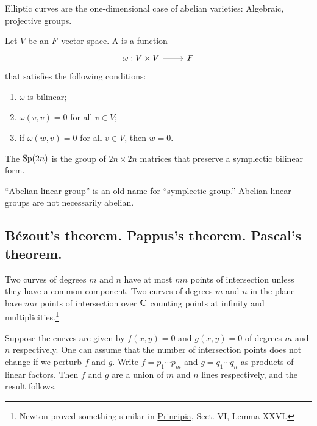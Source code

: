\documentclass [11 pt, oneside] {article}
\begin{document}
Elliptic curves are the one-dimensional case of abelian varieties: Algebraic, projective groups.

\begin{definition}
Let $V$ be an $F$--vector space. A  is a function 
\[
\begin{tikzcd}
\omega :V\times V\ar[r]& F
\end{tikzcd}
\] 
that satisfies the following conditions:
\begin{enumerate}
	\item $\omega$ is bilinear;
	\item $\omega(v,v)=0$ for all $v\in V$;
	\item if $\omega(w,v)=0$ for all $v\in V$, then $w=0$.
\end{enumerate}

\end{definition}

\begin{definition}
The  $\operatorname{Sp}(2n)$ is the group of $2n\times 2n$ matrices that preserve a symplectic bilinear form.
\end{definition}

\begin{warn}
	``Abelian linear group'' is an old name for ``symplectic group.'' Abelian linear groups are not necessarily abelian.
\end{warn}


\subsection{B\'ezout's theorem. Pappus's theorem. Pascal's theorem.}
\label{s_3}

\begin{theorem}[B\'ezout]
\label{}
Two curves of degrees $m$ and $n$ have at most $mn$ points of intersection unless they have a common component. Two curves of degrees $m$ and $n$ in the plane have $mn$ points of intersection over $\mathbf C$ counting points at infinity and multiplicities.\footnote{Newton proved something similar in \ul{Principia}, Sect. VI, Lemma XXVI.}
\end{theorem}

Suppose the curves are given by $f(x,y)=0$ and $g(x,y)=0$ of degrees $m$ and $n$ respectively. One can assume that the number of intersection points does not change if we perturb $f$ and $g$. Write $f=p_1\cdots p_m$ and $g = q_1\cdots q_n$ as products of linear factors. Then $f$ and $g$ are a union of $m$ and $n$ lines respectively, and the result follows.
\end{document}
